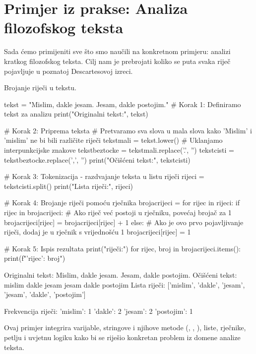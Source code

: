 \section{Primjer iz prakse: Analiza filozofskog teksta}
\label{sec:primjerprakse}

Sada ćemo primijeniti sve što smo naučili na konkretnom primjeru: analizi kratkog filozofskog teksta. Cilj nam je prebrojati koliko se puta svaka riječ pojavljuje u poznatoj Descartesovoj izreci.

\begin{primjerokvir}
    Brojanje riječi u tekstu.
    \begin{pythoncode}
tekst = "Mislim, dakle jesam. Jesam, dakle postojim." # Korak 1: Definiramo tekst za analizu
print("Originalni tekst:", tekst)

# Korak 2: Priprema teksta
# Pretvaramo sva slova u mala slova kako 'Mislim' i 'mislim' ne bi bili različite riječi
tekstmali = tekst.lower()
# Uklanjamo interpunkcijske znakove
tekstbeztocke = tekstmali.replace('.', '')
tekstcisti = tekstbeztocke.replace(',', '')
print("Očišćeni tekst:", tekstcisti)

# Korak 3: Tokenizacija - razdvajanje teksta u listu riječi
rijeci = tekstcisti.split()
print("Lista riječi:", rijeci)

# Korak 4: Brojanje riječi pomoću rječnika
brojacrijeci = {}
for rijec in rijeci:
    if rijec in brojacrijeci:
        # Ako riječ već postoji u rječniku, povećaj brojač za 1
        brojacrijeci[rijec] = brojacrijeci[rijec] + 1
    else:
        # Ako je ovo prvo pojavljivanje riječi, dodaj je u rječnik s vrijednošću 1
        brojacrijeci[rijec] = 1

# Korak 5: Ispis rezultata
print("\nFrekvencija riječi:")
for rijec, broj in brojacrijeci.items():
    print(f"'{rijec}': {broj}")
    \end{pythoncode}

    \begin{codeoutput}
Originalni tekst: Mislim, dakle jesam. Jesam, dakle postojim.
Očišćeni tekst: mislim dakle jesam jesam dakle postojim
Lista riječi: ['mislim', 'dakle', 'jesam', 'jesam', 'dakle', 'postojim']

Frekvencija riječi:
'mislim': 1
'dakle': 2
'jesam': 2
'postojim': 1
    \end{codeoutput}
    Ovaj primjer integrira varijable, stringove i njihove metode (, , ), liste, rječnike,  petlju i  uvjetnu logiku kako bi se riješio konkretan problem iz domene analize teksta.
\end{primjerokvir}

